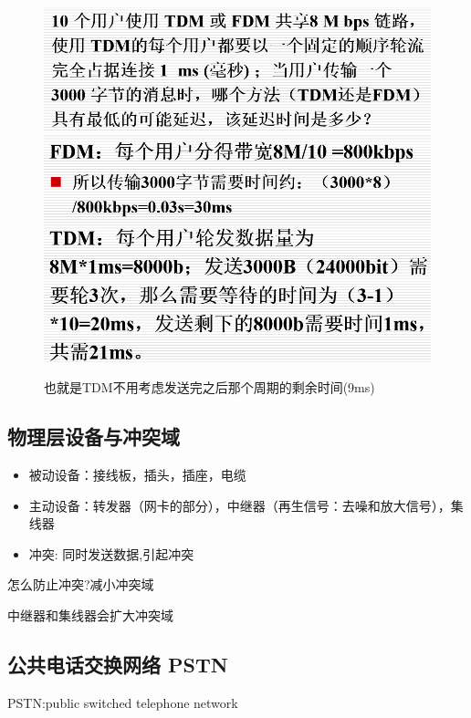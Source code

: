 \documentclass[UTF8,a4paper]{ctexart}
\begin{document}
  \begin{figure}[H]
    \centering
    \includegraphics[scale = 0.3]{assets/jisuanjiwangluo_ee1de.png}
    \includegraphics[scale = 0.3]{assets/jisuanjiwangluo_a7c97.png}
    \caption{也就是TDM不用考虑发送完之后那个周期的剩余时间(9ms)}
  \end{figure}

  \subsection{物理层设备与冲突域}
  \begin{itemize}
    \item 被动设备：接线板，插头，插座，电缆
    \item 主动设备：转发器（网卡的部分），中继器（再生信号：去噪和放大信号），集线器
    \item 冲突: 同时发送数据,引起冲突
  \end{itemize}

  怎么防止冲突?减小冲突域

  中继器和集线器会扩大冲突域

  \subsection{公共电话交换网络 PSTN}
  PSTN:public switched telephone network
\end{document}
